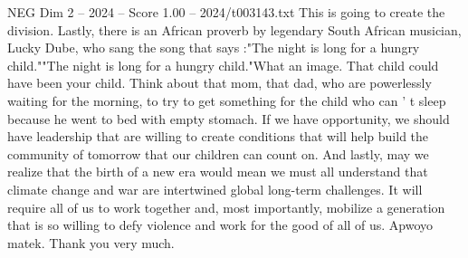 \begin{textsample}{NEG Dim 2 – 2024 – Score 1.00 – 2024/t003143.txt}
This is going to create the division.
Lastly, there is an African proverb by legendary South African musician, Lucky Dube, who sang the song that says :"The night is long for a hungry child.""The night is long for a hungry child."What an image.
That child could have been your child.
Think about that mom, that dad, who are powerlessly waiting for the morning, to try to get something for the child who can ' t sleep because he went to bed with empty stomach.
If we have opportunity, we should have leadership that are willing to create conditions that will help build the community of tomorrow that our children can count on.
And lastly, may we realize that the birth of a new era would mean we must all understand that climate change and war are intertwined global long-term challenges.
It will require all of us to work together and, most importantly, mobilize a generation that is so willing to defy violence and work for the good of all of us.
Apwoyo matek.
Thank you very much.

\end{textsample}
